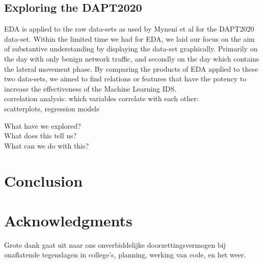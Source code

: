 \documentclass[11pt]{article}
\begin{document}
\subsection{Exploring the DAPT2020}
EDA is applied to the raw data-sets as used by Myneni et al for the DAPT2020 data-set\cite{Myneni2020}. Within the limited time we had for EDA, we laid our focus on the aim of substantive understanding by displaying the data-set graphically. Primarily on the day with only benign network traffic, and secondly on the day which contains the lateral movement phase. By comparing the products of EDA applied to these two data-sets, we aimed to find relations or features that have the potency to increase the effectiveness of the Machine Learning IDS.\\
correlation analysis: which variables correlate with each other:\\
scatterplots, regression models


What have we explored?\\
What does this tell us?\\
What can we do with this?\\

\section{Conclusion}

\section*{Acknowledgments}
Grote dank gaat uit naar ons onverbiddelijke doorzettingsvermogen bij onaflatende tegenslagen in college's, planning, werking van code, en het weer.\cite{Dijk2021}




\end{document}
